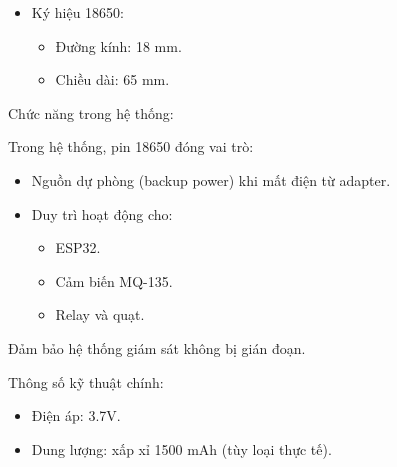 \documentclass[../BTL_PTIT.tex]{subfiles}
\begin{document}
\begin{itemize}[label=\textbullet]
    \item Ký hiệu 18650:
    \begin{itemize}
        \item Đường kính: 18 mm.
        \item Chiều dài: 65 mm.
    \end{itemize}
\end{itemize}

Chức năng trong hệ thống:

Trong hệ thống, pin 18650 đóng vai trò:
\begin{itemize}
    \item Nguồn dự phòng (backup power) khi mất điện từ adapter.
    \item Duy trì hoạt động cho:
    \begin{itemize}
        \item ESP32.
        \item Cảm biến MQ-135.
        \item Relay và quạt.
    \end{itemize}
\end{itemize}

Đảm bảo hệ thống giám sát không bị gián đoạn.

Thông số kỹ thuật chính:
\begin{itemize}
    \item Điện áp: 3.7V.
    \item Dung lượng: xấp xỉ 1500 mAh (tùy loại thực tế).
\end{itemize}

\end{document}
